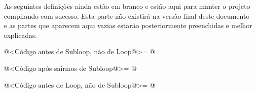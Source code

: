 
As seguintes definições ainda estão em branco e estão aqui para manter
o projeto compilando com sucesso. Esta parte não existirá na versão
final deste documento e as partes que aparecem aqui vazias estarão
posteriormente preenchidas e melhor explicadas.

\iniciocodigo
@<Código antes de Subloop, não de Loop@>=
@
\fimcodigo

\iniciocodigo
@<Código após sairmos de Subloop@>=
@
\fimcodigo



\iniciocodigo
@<Código antes de Loop, não de Subloop@>=
@
\fimcodigo






\fim
